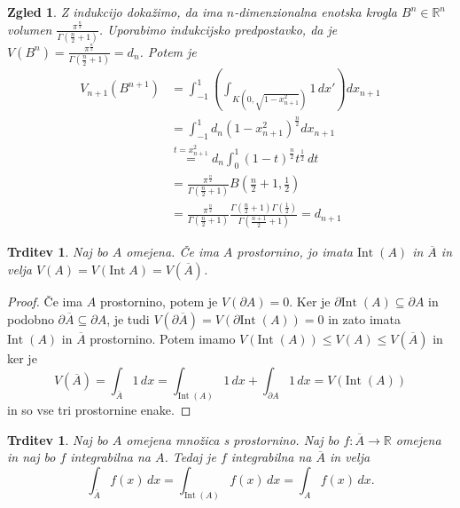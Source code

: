 \documentclass[10pt, a4paper]{article}
\newtheorem{trditev}[izr]{Trditev}
\newtheorem{zgled}{Zgled}[section]
\newenvironment{noticeC}{%
  \tcolorbox[%
  notitle,
  empty,
  enhanced,  %
  breakable,
  coltext=black, 
  fontupper=\rmfamily,
  parbox=false,
  noparskip,
  sharp corners,
  boxrule=-1pt,  %
  frame hidden,
  left=7pt,  %
  right=7pt,
  top=5pt,
  bottom=5pt,
  before skip=2.5ex plus 2pt,
  after skip=2.5ex plus 2pt,
  overlay unbroken and last={%
  },
  ]}
{\endtcolorbox}
\newenvironment{dokaz}%
  {\begin{noticeC}\begin{proof}}%
  {\end{proof}\end{noticeC}}
\newcommand{\R}{\mathbb {R}}
\newcommand{\inte}{\mathrm{Int}}
\begin{document}
\begin{zgled}
    Z indukcijo dokažimo, da ima $n$-dimenzionalna enotska krogla $B^n \in \R^n$
    volumen $\frac{\pi^{\frac{n}{2}}}{\Gamma(\frac{n}{2} + 1)}$.
    Uporabimo indukcijsko predpostavko, da je $V(B^n) = \frac{\pi^{\frac{n}{2}}}{\Gamma(\frac{n}{2} + 1)} = d_n$.
    Potem je 
    \begin{align*}
        V_{n + 1} (B^{n + 1}) &= \int_{-1} ^1 \left(\int_{{K(0, \sqrt{1 - x_{n + 1}^2})}} 1\, dx'\right)dx_{n + 1}\\
        &= \int_{-1} ^1 d_n (1 - x_{n + 1}^2)^{\frac{n}{2}} dx_{n +1}\\
        &\stackrel{t = x_{n + 1}^2}{=} d_n \int_0 ^1 (1 - t)^{\frac{n}{2}} t^{\frac{1}{2}}\, dt\\
        &= \frac{\pi^{\frac{n}{2}}}{\Gamma (\frac{n}{2} + 1)} B\left(\frac{n}{2} + 1, \frac{1}{2}\right)\\
        &= \frac{\pi^{\frac{n}{2}}}{\Gamma (\frac{n}{2} + 1)} \frac{\Gamma (\frac{n}{2} + 1) \Gamma(\frac{1}{2})}{\Gamma (\frac{n + 1}{2} + 1)} = d_{n + 1}
    \end{align*}
\end{zgled}

\begin{trditev}
    Naj bo $A$ omejena. Če ima $A$ prostornino, jo imata $\inte\; (A)$ in $\overline{A}$ in velja 
    $V(A) = V(\inte\; A) = V(\overline{A})$.
\end{trditev}

\begin{dokaz}
    Če ima $A$ prostornino, potem je $V (\partial A) = 0$.
    Ker je $\partial \inte\; (A) \subseteq \partial A$ in podobno 
    $\partial \overline{A} \subseteq \partial A$, je tudi $V (\partial \overline{A}) = V(\partial \inte\; (A)) = 0$
    in zato imata $\inte\; (A)$ in $\overline{A}$ prostornino.
    Potem imamo $V(\inte\; (A)) \leq V(A) \leq V(\overline{A})$ in ker je 
    $$V(\overline{A}) = \int_{\overline{A}} 1\, dx = \int_{\inte\; (A)} 1 \, dx + \int_{\partial A} 1\, dx = V(\inte\; (A))$$
    in so vse tri prostornine enake.
\end{dokaz}

\begin{trditev}
    Naj bo $A$ omejena množica s prostornino.
    Naj bo $f: \overline{A} \to \R$ omejena in naj bo $f$
    integrabilna na $A$. Tedaj je $f$ integrabilna na $\overline{A}$
    in velja $$\int_{\overline{A}} f(x)\, dx = \int_{\inte\; (A)} f(x)\, dx = \int_A f(x)\, dx.$$
\end{trditev}
\end{document}
